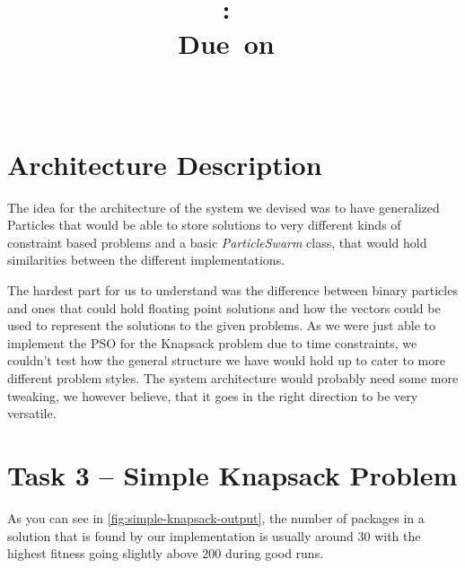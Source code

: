 \documentclass{scrartcl}
\title{
\vspace{2in}
\textmd{\textbf{\hmwkClass:\ \hmwkTitle}}\\
\normalsize\vspace{0.1in}\small{Due\ on\ \hmwkDueDate}\\
\vspace{0.1in}\large{\textit{\hmwkClassInstructor\ \hmwkClassTime}}
\vspace{3in}
}
\author{\textbf{\hmwkAuthorName}}
\date{} %
\begin{document}
\maketitle



\newpage
\tableofcontents
\newpage

\section{Architecture Description}

The idea for the architecture of the system we devised was to have generalized Particles that would be able to store solutions to very different kinds of constraint based problems and a basic \textit{ParticleSwarm} class, that would hold similarities between the different implementations.

The hardest part for us to understand was the difference between binary particles and ones that could hold floating point solutions and how the vectors could be used to represent the solutions to the given problems. As we were just able to implement the PSO for the Knapsack problem due to time constraints, we couldn't test how the general structure we have would hold up to cater to more different problem styles. The system architecture would probably need some more tweaking, we however believe, that it goes in the right direction to be very versatile.

\section{Task 3 -- Simple Knapsack Problem}

As you can see in \autoref{fig:simple-knapsack-output}, the number of packages in a solution that is found by our implementation is usually around 30 with the highest fitness going slightly above 200 during good runs.
\end{document}
